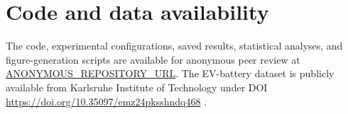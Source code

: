 \section*{Code and data availability}
The code, experimental configurations, saved results, statistical analyses,
and figure-generation scripts are available for anonymous peer review at
\url{ANONYMOUS_REPOSITORY_URL}.
The EV-battery dataset is publicly available from Karlsruhe Institute of
Technology under DOI \url{https://doi.org/10.35097/emz24pksshndq468}
\cite{Baucks2026Dataset}.
